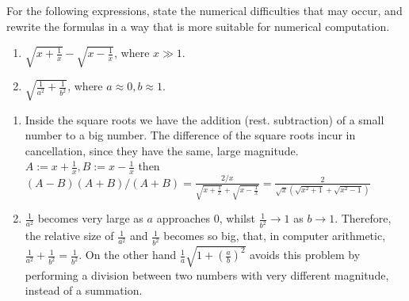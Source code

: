 \begin{problem}
\begin{subproblem}[2]
 \end{subproblem}

 \begin{subproblem}[2]
  For the following expressions, state the numerical difficulties that may occur, and rewrite the formulas in a way that is more suitable for numerical computation.
  \begin{enumerate}
   \item $\sqrt{x + \frac{1}{x}} - \sqrt{x - \frac{1}{x}}$, where $x \gg 1$.
   \item $\sqrt{\frac{1}{a^2} + \frac{1}{b^2}}$, where $a \approx 0, b \approx 1$.
  \end{enumerate}
  
  \begin{solution}
  \begin{enumerate}
   \item Inside the square roots we have the addition (rest. subtraction) of a small number to a big number. The difference of the square roots incur in cancellation, since they have the same, large magnitude. $A := x + \frac{1}{x}, B := x - \frac{1}{x}$ then $(A-B)(A+B)/(A+B) = \frac{2/x}{\sqrt{x + \frac{1}{x}} + \sqrt{x - \frac{1}{x}}} = \frac{2}{\sqrt{x} (\sqrt{x^2 + 1} + \sqrt{x^2 - 1})}$
   \item $\frac{1}{a^2}$ becomes very large as $a$ approaches $0$, whilst $\frac{1}{b^2} \rightarrow 1$ as $b \rightarrow 1$. Therefore, the relative size of $\frac{1}{a^2}$ and $\frac{1}{b^2}$ becomes so big, that, in computer arithmetic, $\frac{1}{a^2} + \frac{1}{b^2} = \frac{1}{b^2}$. On the other hand
   $\frac{1}{a}\sqrt{1+(\frac{a}{b})^{2}}$ avoids this problem by performing a division between two numbers with very different magnitude, instead of a summation.
  \end{enumerate}
  \end{solution}
 \end{subproblem}
\end{problem}
 